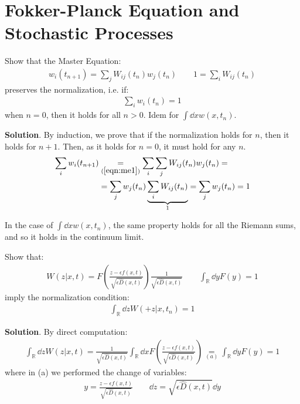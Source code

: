 \documentclass[../template.tex]{subfiles}
\begin{document}
\chapter{Fokker-Planck Equation and Stochastic Processes}

\begin{exo}
    Show that the Master Equation:
    \begin{align}\label{eqn:me1}
        w_i(t_{n+1}) = \sum_{j} W_{ij}(t_n) w_j(t_n) \qquad 1 = \sum_{i} W_{ij}(t_n)
    \end{align}
    preserves the normalization, i.e. if:
    \begin{align*}
        \sum_{i} w_i(t_n) = 1
    \end{align*}
    when $n=0$, then it holds for all $n>0$. Idem for $\int \dd{x} w(x,t_n)$.

    \medskip

    \textbf{Solution}. By induction, we prove that if the normalization holds for $n$, then it holds for $n+1$. Then, as it holds for $n=0$, it must hold for any $n$.
    \begin{align*}
        \sum_{i} w_i(t_{n+1}) &\underset{(\ref{eqn:me1})}{=}   \sum_i \sum_j W_{ij}(t_n) w_j(t_n) =\\
        &= \sum_j w_j(t_n) \underbrace{\sum_i W_{ij}(t_n)}_{1}  = \sum_j w_j(t_n) = 1
    \end{align*}

    In the case of $\int \dd{x} w(x,t_n)$, the same property holds for all the Riemann sums, and so it holds in the continuum limit.
\end{exo}

\begin{exo}
Show that:
\begin{align}\label{eqn:jump}
    W(z|x,t) = F\left(\frac{z-\epsilon f(x,t)}{\sqrt{\epsilon \hat{D}(x,t)}} \right) \frac{1}{\sqrt{\epsilon \hat{D}(x,t)}} \qquad \int_{\mathbb{R}} \dd{y} F(y) = 1
\end{align}
imply the normalization condition:
\begin{align*}
    \int_{\mathbb{R}} \dd{z} W(+z|x,t_n) = 1
\end{align*}   

\medskip

\textbf{Solution}. By direct computation:
\begin{align*}
    \int_{\mathbb{R}} \dd{z} W(z|x,t) = \frac{1}{\sqrt{\epsilon \hat{D}(x,t)}} \int_{\mathbb{R}} \dd{x} F\left(\frac{z-\epsilon f(x,t)}{\sqrt{\epsilon \hat{D}(x,t)}} \right) \underset{(a)}{=} \int_{\mathbb{R}} \dd{y} F(y) = 1
\end{align*} 
where in (a) we performed the change of variables:
\begin{align} \label{eqn:change}
    y = \frac{z-\epsilon f(x,t)}{\sqrt{\epsilon \hat{D}(x,t)}}  \qquad \dd{z} = \sqrt{\epsilon \hat{D}(x,t)} \dd{y} 
\end{align}
\end{exo}
\end{document}
